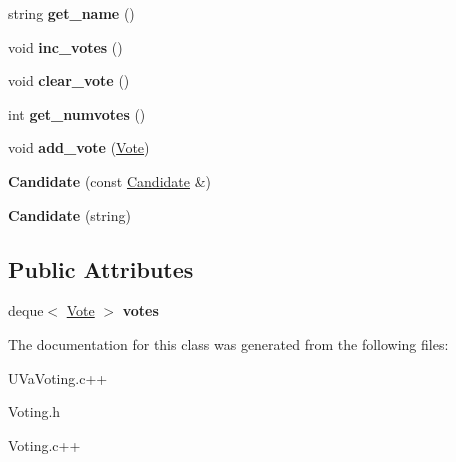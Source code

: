 \begin{DoxyCompactItemize}
\item 
\hypertarget{classCandidate_a3d8b668603df6dd67e82536b8e19d038}{string {\bfseries get\-\_\-name} ()}\label{classCandidate_a3d8b668603df6dd67e82536b8e19d038}

\item 
\hypertarget{classCandidate_ad1510f0751e955efe3e839b2e895212e}{void {\bfseries inc\-\_\-votes} ()}\label{classCandidate_ad1510f0751e955efe3e839b2e895212e}

\item 
\hypertarget{classCandidate_abe8de7922a9a9e44d0a4d39e6d98c92b}{void {\bfseries clear\-\_\-vote} ()}\label{classCandidate_abe8de7922a9a9e44d0a4d39e6d98c92b}

\item 
\hypertarget{classCandidate_a0b03c5eb1b106c82f4e2bf4f2d131153}{int {\bfseries get\-\_\-numvotes} ()}\label{classCandidate_a0b03c5eb1b106c82f4e2bf4f2d131153}

\item 
\hypertarget{classCandidate_a2fc0d1f3cc86d97a2f67a44b114c2efa}{void {\bfseries add\-\_\-vote} (\hyperlink{classVote}{\-Vote})}\label{classCandidate_a2fc0d1f3cc86d97a2f67a44b114c2efa}

\item 
\hypertarget{classCandidate_a5bc62d2f4a945f20db0b0f75363439b9}{{\bfseries \-Candidate} (const \hyperlink{classCandidate}{\-Candidate} \&)}\label{classCandidate_a5bc62d2f4a945f20db0b0f75363439b9}

\item 
\hypertarget{classCandidate_a8fe5607955ab82eb05d6af1a9ce26e0a}{{\bfseries \-Candidate} (string)}\label{classCandidate_a8fe5607955ab82eb05d6af1a9ce26e0a}

\end{DoxyCompactItemize}
\subsection*{\-Public \-Attributes}
\begin{DoxyCompactItemize}
\item 
\hypertarget{classCandidate_a35c1138294ca0bbc310d57d69b58b71f}{deque$<$ \hyperlink{classVote}{\-Vote} $>$ {\bfseries votes}}\label{classCandidate_a35c1138294ca0bbc310d57d69b58b71f}

\end{DoxyCompactItemize}


\-The documentation for this class was generated from the following files\-:\begin{DoxyCompactItemize}
\item 
\-U\-Va\-Voting.\-c++\item 
\-Voting.\-h\item 
\-Voting.\-c++\end{DoxyCompactItemize}
